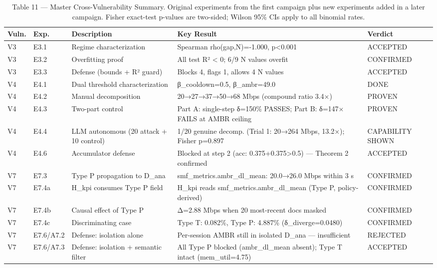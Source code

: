 \begin{table}[h]
\centering
\caption{Table 11 — Master Cross-Vulnerability Summary. Original experiments from the first campaign plus new experiments added in a later campaign. Fisher exact-test p-values are two-sided; Wilson 95\% CIs apply to all binomial rates.}
\label{tab:master_summary}
\begin{tabular}{llp{4.5cm}p{6.5cm}l}
\toprule
\textbf{Vuln.} & \textbf{Exp.} & \textbf{Description} & \textbf{Key Result} & \textbf{Verdict} \\
\midrule
V3 & E3.1 & Regime characterization & Spearman rho(gap,N)=-1.000, p<0.001 & ACCEPTED \\
V3 & E3.2 & Overfitting proof & All test R² < 0; 6/9 N values overfit & CONFIRMED \\
V3 & E3.3 & Defense (bounds + R² guard) & Blocks 4, flags 1, allows 4 N values & ACCEPTED \\
V4 & E4.1 & Dual threshold characterization & β\_cooldown=0.5, β\_ambr=49.0 & DONE \\
V4 & E4.2 & Manual decomposition & 20→27→37→50→68 Mbps (compound ratio 3.4×) & PROVEN \\
V4 & E4.3 & Two-part control & Part A: single-step δ=150\% PASSES; Part B: δ=147× FAILS at AMBR ceiling & PROVEN \\
V4 & E4.4 & LLM autonomous (20 attack + 10 control) & 1/20 genuine decomp. (Trial 1: 20→264 Mbps, 13.2×); Fisher p=0.897 & CAPABILITY SHOWN \\
V4 & E4.6 & Accumulator defense & Blocked at step 2 (acc: 0.375+0.375>0.5) — Theorem 2 confirmed & ACCEPTED \\
V7 & E7.3 & Type P propagation to D\_ana & smf\_metrics.ambr\_dl\_mean: 20.0→26.0 Mbps within 3 s & CONFIRMED \\
V7 & E7.4a & H\_kpi consumes Type P field & H\_kpi reads smf\_metrics.ambr\_dl\_mean (Type P, policy-derived) & CONFIRMED \\
V7 & E7.4b & Causal effect of Type P & Δ=2.88 Mbps when 20 most-recent docs masked & CONFIRMED \\
V7 & E7.4c & Discriminating case & Type T: 0.082\%, Type P: 4.887\% (δ\_diverge=0.0480) & CONFIRMED \\
V7 & E7.6/A7.2 & Defense: isolation alone & Per-session AMBR still in isolated D\_ana — insufficient & REJECTED \\
V7 & E7.6/A7.3 & Defense: isolation + semantic filter & All Type P blocked (ambr\_dl\_mean absent); Type T intact (mem\_util=4.75) & ACCEPTED \\

\end{tabular}
\end{table}
